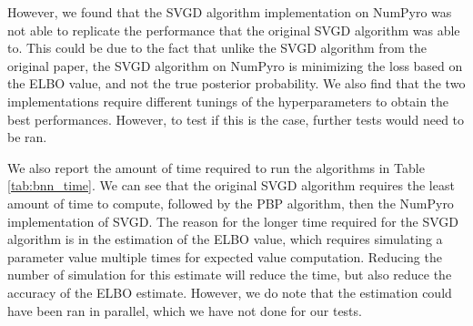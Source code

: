 However, we found that the SVGD algorithm implementation on NumPyro was not able to replicate the performance that the original SVGD algorithm was able to. This could be due to the fact that unlike the SVGD algorithm from the original paper, the SVGD algorithm on NumPyro is minimizing the loss based on the ELBO value, and not the true posterior probability. We also find that the two implementations require different tunings of the hyperparameters to obtain the best performances. However, to test if this is the case, further tests would need to be ran.

We also report the amount of time required to run the algorithms in Table \ref{tab:bnn_time}. We can see that the original SVGD algorithm requires the least amount of time to compute, followed by the PBP algorithm, then the NumPyro implementation of SVGD. The reason for the longer time required for the SVGD algorithm is in the estimation of the ELBO value, which requires simulating a parameter value multiple times for expected value computation. Reducing the number of simulation for this estimate will reduce the time, but also reduce the accuracy of the ELBO estimate. However, we do note that the estimation could have been ran in parallel, which we have not done for our tests.

